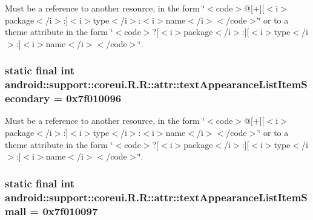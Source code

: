 Must be a reference to another resource, in the form \char`\"{}$<$code$>$@\mbox{[}+\mbox{]}\mbox{[}$<$i$>$package$<$/i$>$:\mbox{]}$<$i$>$type$<$/i$>$:$<$i$>$name$<$/i$>$$<$/code$>$\char`\"{} or to a theme attribute in the form \char`\"{}$<$code$>$?\mbox{[}$<$i$>$package$<$/i$>$:\mbox{]}\mbox{[}$<$i$>$type$<$/i$>$:\mbox{]}$<$i$>$name$<$/i$>$$<$/code$>$\char`\"{}. \hypertarget{classandroid_1_1support_1_1coreui_1_1_r_1_1attr_655a2ff50586d64a648b270d33bc27e6}{
\subsubsection[{textAppearanceListItemSecondary}]{\setlength{\rightskip}{0pt plus 5cm}static final int android::support::coreui.R.R::attr::textAppearanceListItemSecondary = 0x7f010096}}
\label{classandroid_1_1support_1_1coreui_1_1_r_1_1attr_655a2ff50586d64a648b270d33bc27e6}


Must be a reference to another resource, in the form \char`\"{}$<$code$>$@\mbox{[}+\mbox{]}\mbox{[}$<$i$>$package$<$/i$>$:\mbox{]}$<$i$>$type$<$/i$>$:$<$i$>$name$<$/i$>$$<$/code$>$\char`\"{} or to a theme attribute in the form \char`\"{}$<$code$>$?\mbox{[}$<$i$>$package$<$/i$>$:\mbox{]}\mbox{[}$<$i$>$type$<$/i$>$:\mbox{]}$<$i$>$name$<$/i$>$$<$/code$>$\char`\"{}. \hypertarget{classandroid_1_1support_1_1coreui_1_1_r_1_1attr_3493313e24a2f66d145206fba35d9396}{
\subsubsection[{textAppearanceListItemSmall}]{\setlength{\rightskip}{0pt plus 5cm}static final int android::support::coreui.R.R::attr::textAppearanceListItemSmall = 0x7f010097}}
\label{classandroid_1_1support_1_1coreui_1_1_r_1_1attr_3493313e24a2f66d145206fba35d9396}



